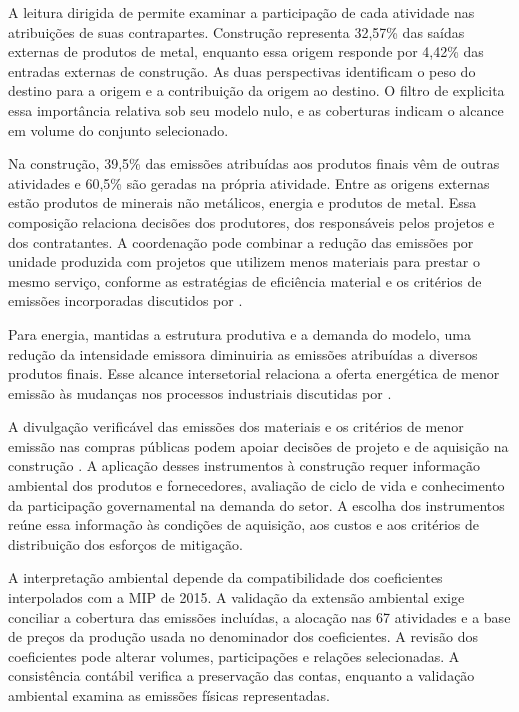 \documentclass[11pt]{article}
\begin{document}
A leitura dirigida de \textcite{huang2019} permite examinar a participação de cada atividade nas atribuições de suas contrapartes. Construção representa 32,57\% das saídas externas de produtos de metal, enquanto essa origem responde por 4,42\% das entradas externas de construção. As duas perspectivas identificam o peso do destino para a origem e a contribuição da origem ao destino. O filtro de \textcite{serrano2009} explicita essa importância relativa sob seu modelo nulo, e as coberturas indicam o alcance em volume do conjunto selecionado.

Na construção, 39,5\% das emissões atribuídas aos produtos finais vêm de outras atividades e 60,5\% são geradas na própria atividade. Entre as origens externas estão produtos de minerais não metálicos, energia e produtos de metal. Essa composição relaciona decisões dos produtores, dos responsáveis pelos projetos e dos contratantes. A coordenação pode combinar a redução das emissões por unidade produzida com projetos que utilizem menos materiais para prestar o mesmo serviço, conforme as estratégias de eficiência material e os critérios de emissões incorporadas discutidos por \textcite[seções~5.1 e~6.4]{rissman2020}.

Para energia, mantidas a estrutura produtiva e a demanda do modelo, uma redução da intensidade emissora diminuiria as emissões atribuídas a diversos produtos finais. Esse alcance intersetorial relaciona a oferta energética de menor emissão às mudanças nos processos industriais discutidas por \textcite[seções~4.2 e~7.2]{rissman2020}.

A divulgação verificável das emissões dos materiais e os critérios de menor emissão nas compras públicas podem apoiar decisões de projeto e de aquisição na construção \parencite[seções~6.6 e~6.7]{rissman2020}. A aplicação desses instrumentos à construção requer informação ambiental dos produtos e fornecedores, avaliação de ciclo de vida e conhecimento da participação governamental na demanda do setor. A escolha dos instrumentos reúne essa informação às condições de aquisição, aos custos e aos critérios de distribuição dos esforços de mitigação.

A interpretação ambiental depende da compatibilidade dos coeficientes interpolados com a MIP de 2015. A validação da extensão ambiental exige conciliar a cobertura das emissões incluídas, a alocação nas 67 atividades e a base de preços da produção usada no denominador dos coeficientes. A revisão dos coeficientes pode alterar volumes, participações e relações selecionadas. A consistência contábil verifica a preservação das contas, enquanto a validação ambiental examina as emissões físicas representadas.
\end{document}

